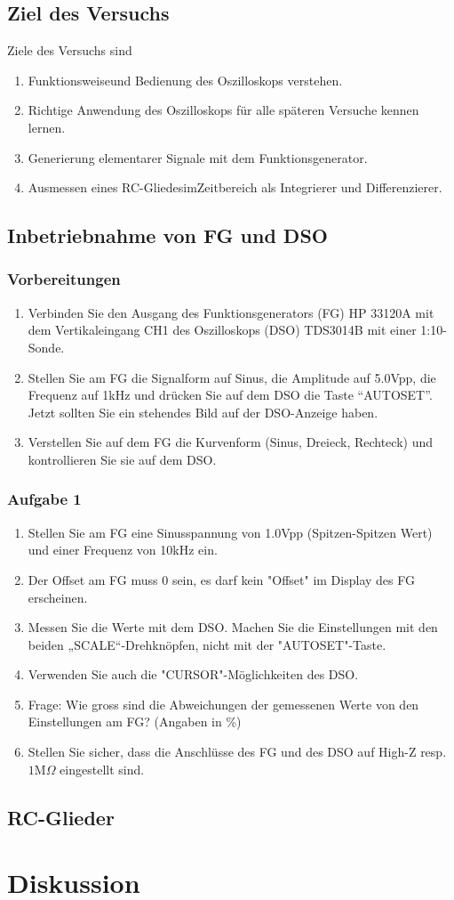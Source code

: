 \subsection{Ziel des Versuchs}
Ziele des Versuchs sind
\begin{enumerate}[$a)$]
\item Funktionsweiseund Bedienung des Oszilloskops verstehen.
\item Richtige Anwendung des Oszilloskops für alle späteren Versuche kennen lernen.
\item Generierung elementarer Signale mit dem Funktionsgenerator.
\item Ausmessen eines RC-GliedesimZeitbereich als Integrierer und Differenzierer.
\end{enumerate}
\subsection{Inbetriebnahme von FG und DSO}
\subsubsection{Vorbereitungen}
\begin{enumerate}[$a)$]
\item Verbinden Sie den Ausgang des Funktionsgenerators (FG) HP 33120A mit dem Vertikaleingang CH1 des Oszilloskops (DSO) TDS3014B mit einer 1:10-Sonde.
\item Stellen Sie am FG die Signalform auf Sinus, die Amplitude auf 5.0Vpp, die Frequenz auf 1kHz und drücken Sie auf dem DSO die Taste ``AUTOSET''. Jetzt sollten Sie ein stehendes Bild auf der DSO-Anzeige haben.
\item Verstellen Sie auf dem FG die Kurvenform (Sinus, Dreieck, Rechteck) und kontrollieren Sie sie auf dem DSO.
\end{enumerate}
\subsubsection{Aufgabe 1}
\begin{enumerate}[$\bullet$]
\item Stellen Sie am FG eine Sinusspannung von 1.0Vpp (Spitzen-Spitzen Wert) und einer Frequenz von 10kHz ein. 
\item Der Offset am FG muss 0 sein, es darf kein "Offset" im Display des FG erscheinen.
\item Messen Sie die Werte mit dem DSO. Machen Sie die Einstellungen mit den beiden „SCALE“-Drehknöpfen, nicht mit der "AUTOSET"-Taste. 
\item Verwenden Sie auch die "CURSOR"-Möglichkeiten des DSO. 
\item Frage: Wie gross sind die Abweichungen der gemessenen Werte von den Einstellungen am FG? (Angaben in \%) 
\item Stellen Sie sicher, dass die Anschlüsse des FG und des DSO auf High-Z resp. $1\text{M}\Omega$ eingestellt sind.
\end{enumerate}
\subsection{RC-Glieder}
\section{Diskussion}